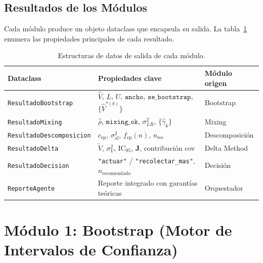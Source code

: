 \documentclass[12pt,a4paper]{article}
\begin{document}
\subsection{Resultados de los Módulos}

Cada módulo produce un objeto dataclass que encapsula su salida. La tabla~\ref{tab:results} enumera las propiedades principales de cada resultado.

\begin{table}[h]
	\centering
	\caption{Estructuras de datos de salida de cada módulo.}
	\label{tab:results}
	\begin{tabular}{@{}lll@{}}
		\toprule
		Dataclass                        & Propiedades clave                                                                     & Módulo origen  \\
		\midrule
		\texttt{ResultadoBootstrap}      & $\hat{V}$, $L$, $U$, $\texttt{ancho}$, $\texttt{se\_bootstrap}$, $\{\hat{V}^{*(b)}\}$ & Bootstrap      \\
		\texttt{ResultadoMixing}         & $\hat{\rho}$, $\texttt{mixing\_ok}$, $\sigma^2_{LR}$, $\{\hat{\gamma}_k\}$            & Mixing         \\
		\texttt{ResultadoDescomposicion} & $c_{\text{ep}}$, $\sigma^2_{\text{al}}$, $f_{\text{ep}}(n)$, $n_{\text{rec}}$         & Descomposición \\
		\texttt{ResultadoDelta}          & $\tilde{V}$, $\sigma^2_V$, IC$_{95}$, $\mathbf{J}$, contribución cov                  & Delta Method   \\
		\texttt{ResultadoDecision}       & \texttt{"actuar"} / \texttt{"recolectar\_mas"}, $n_{\text{recomendado}}$              & Decisión       \\
		\texttt{ReporteAgente}           & Reporte integrado con garantías teóricas                                              & Orquestador    \\
		\bottomrule
	\end{tabular}
\end{table}

\newpage

\section{Módulo 1: Bootstrap (Motor de Intervalos de Confianza)}
\end{document}
